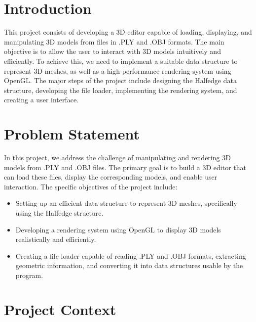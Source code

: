 \documentclass[12pt,a4paper]{article}
\begin{document}

\tableofcontents

\newpage


\section{Introduction}

This project consists of developing a 3D editor capable of loading, displaying, and manipulating 3D models from files in .PLY and .OBJ formats. 
The main objective is to allow the user to interact with 3D models intuitively and efficiently. 
To achieve this, we need to implement a suitable data structure to represent 3D meshes, as well as a high-performance rendering system using OpenGL. 
The major steps of the project include designing the Halfedge data structure, developing the file loader, implementing the rendering system, and creating a user interface.

\section{Problem Statement}

In this project, we address the challenge of manipulating and rendering 3D models from .PLY and .OBJ files. The primary goal is to build a 3D editor that can load these files, display the corresponding models, and enable user interaction. 
The specific objectives of the project include:
\begin{itemize}
    \item Setting up an efficient data structure to represent 3D meshes, specifically using the Halfedge structure.
    \item Developing a rendering system using OpenGL to display 3D models realistically and efficiently.
    \item Creating a file loader capable of reading .PLY and .OBJ formats, extracting geometric information, and converting it into data structures usable by the program.
\end{itemize}

\newpage
\section{Project Context}
\end{document}
